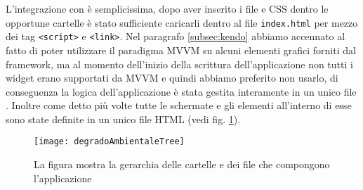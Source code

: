 			L'integrazione con \kendomob{} è semplicissima, dopo aver inserito 
			i file \js{} e CSS dentro le opportune cartelle è stato sufficiente 
			caricarli dentro al file \texttt{index.html} per mezzo dei tag 
			\texttt{<script>} e \texttt{<link>}.
			Nel paragrafo \ref{subsec:kendo} abbiamo accennato al fatto di poter 
			utilizzare il paradigma MVVM su alcuni elementi grafici forniti dal 
			framework, ma al momento dell'inizio della scrittura dell'applicazione 
			non tutti i widget erano supportati da MVVM e quindi abbiamo preferito 
			non usarlo, di conseguenza la logica dell'applicazione è stata gestita 
			interamente in un unico file \js{}. Inoltre come detto più volte 
			tutte le schermate e gli elementi all'interno di esse sono state 
			definite in un unico file HTML (vedi fig. \ref{fig:degradoAmbientaleTree}).
			\begin{figure}[h]
				\centering
				\texttt{[image: degradoAmbientaleTree]}
				\caption{
				La figura mostra la gerarchia delle cartelle e dei file che 
				compongono l'applicazione
				}
				\label{fig:degradoAmbientaleTree}
			\end{figure}
			
